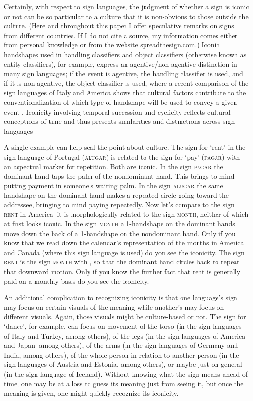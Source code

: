 \documentclass[output=paper,
modfonts
]{LSP/langsci}
\begin{document}
Certainly, with respect to sign languages, the judgment of whether a
sign is iconic or not can be so particular to a culture that it is
non-obvious to those outside the culture. (Here and throughout this
paper I offer speculative remarks on signs from different countries. If
I do not cite a source, my information comes either from personal
knowledge or from the website spreadthesign.com.) Iconic handshapes used
in handling classifiers and object classifiers (otherwise known as
entity classifiers), for example, express an agentive/non-agentive
distinction in many sign languages; if the event is agentive, the
handling classifier is used, and if it is non-agentive, the object
classifier is used, where a recent comparison of the sign languages of
Italy and America shows that cultural factors contribute to the
conventionalization of which type of handshape will be used to convey a
given event \citep{brentari2015}. Iconicity involving temporal
succession and cyclicity reflects cultural conceptions of time and thus
presents similarities and distinctions across sign languages \citep{kosecki2014}.

A single example can help seal the point about culture. The sign for
`rent' in the sign language of Portugal (\textsc{alugar}) is related to
the sign for `pay' (\textsc{pagar}) with an aspectual marker for
repetition. Both are iconic. In the sign \textsc{pagar} the dominant
hand taps the palm of the nondominant hand. This brings to mind putting
payment in someone's waiting palm. In the sign \textsc{alugar} the same
handshape on the dominant hand makes a repeated circle going toward the
addressee, bringing to mind paying repeatedly. Now let's compare to the
sign \textsc{rent} in America\textsc{;} it is morphologically related to
the sign \textsc{month,} neither of which at first looks iconic. In the
sign \textsc{month} a 1-handshape on the dominant hands move down the
back of a 1-handshape on the nondominant hand. Only if you know that we
read down the calendar's representation of the months in America and
Canada (where this sign language is used) do you see the iconicity. The
sign \textsc{rent} is the sign \textsc{month} with , so
that the dominant hand circles back to repeat that downward motion. Only
if you know the further fact that rent is generally paid on a monthly
basis do you see the iconicity.

An additional complication to recognizing iconicity is that one
language's sign may focus on certain visuals of the meaning while
another's may focus on different visuals. Again, those visuals might be
culture-based or not. The sign for `dance', for example, can focus on
movement of the torso (in the sign languages of Italy and Turkey, among
others), of the legs (in the sign languages of America and Japan, among
others), of the arms (in the sign languages of Germany and India, among
others), of the whole person in relation to another person (in the sign
languages of Austria and Estonia, among others), or maybe just on
general  (in the sign language of Iceland). Without knowing what
the sign means ahead of time, one may be at a loss to guess its meaning
just from seeing it, but once the meaning is given, one might quickly
recognize its iconicity.
\end{document}
